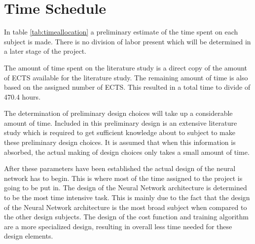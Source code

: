 \section{Time Schedule}
\label{TimeTable}

In table \ref{tab:timeallocation} a preliminary estimate of the time spent on each subject is made. There is no division of labor present which will be determined in a later stage of the project.

The amount of time spent on the literature study is a direct copy of the amount of ECTS available for the literature study. The remaining amount of time is also based on the assigned number of ECTS. This resulted in a total time to divide of 470.4 hours.

The determination of preliminary design choices will take up a considerable amount of time. Included in this preliminary design is an extensive literature study which is required to get sufficient knowledge about to subject to make these preliminary design choices. It is assumed that when this information is absorbed, the actual making of design choices only takes a small amount of time.

After these parameters have been established the actual design of the neural network has to begin. This is where most of the time assigned to the project is going to be put in. The design of the Neural Network architecture is determined to be the most time intensive task. 
This is mainly due to the fact that the design of the Neural Network architecture is the most broad subject when compared to the other design subjects. The design of the cost function and training algorithm are a more specialized design, resulting in overall less time needed for these design elements.

